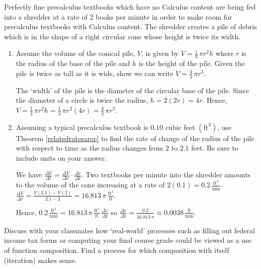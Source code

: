 \documentclass{ximera}
\begin{document}
\begin{problem}
Perfectly fine precalculus textbooks which have no Calculus content are being fed into a shredder at a rate of 2 books per minute in order to make room for precalculus textbooks with Calculus content.  The shredder creates a pile of debris which is in the shape of a right circular cone whose height is twice its width. 

\begin{enumerate}

\item  Assume the volume of the conical pile, $V$,  is given by $V = \frac{1}{3} \, \pi r^2 h$ where $r$ is the radius of the base of the pile and $h$ is the height of the pile.  Given the pile is twice as tall as it is wide, show we can write $V = \frac{4}{3} \, \pi r^3$.

\begin{solution}
    The `width' of the pile is the diameter of the circular base of the pile.  Since the diameter of a circle is twice the radius,  $h = 2 (2r) = 4r$.  Hence, $V = \frac{1}{3} \, \pi r^2 h = \frac{1}{3} \, \pi r^2 (4r) = \frac{4}{3} \, \pi r^3$.
\end{solution}

\item  Assuming a typical precalculus textbook is $0.10$ cubic feet $\left( \text{ft}^3 \right)$, use Theorem \ref{relatedratesaroc} to find the rate of change of the radius of the pile with respect to time as the radius changes from $2$ to $2.1$ feet. Be sure to include units on your answer.

\begin{solution}
     We have $\frac{\Delta V}{\Delta t} = \frac{\Delta V}{ \Delta r} \cdot \frac{\Delta r}{\Delta t}$.    Two textbooks per minute into the shredder amounts to the volume of the cone increasing at a rate of $2(0.1) = 0.2 \, \frac{\text{ft}^3}{\text{min}}$.  $\frac{\Delta V}{\Delta r}= \frac{V(2.1) - V(2)}{2.1 - 2} = 16.81\overline{3}  \, \pi \, \frac{\text{ft}^3}{\text{ft}}$.

Hence, $0.2 \, \frac{\text{ft}^3}{\text{min}} = 16.81\overline{3} \, \pi \, \frac{\text{ft}^3}{\text{ft}} \, \frac{\Delta r}{\Delta t}$ so $\frac{\Delta r}{\Delta t} = \frac{0.2}{ 16.81\overline{3} \, \pi }  \approx 0.0038 \, \frac{\text{ft}}{\text{min}}$.

\end{solution}

\end{enumerate}
\end{problem}

\begin{problem}
Discuss with your classmates how `real-world' processes such as filling out federal income tax forms or computing your final course grade could be viewed as a use of function composition.  Find a process for which composition with itself (iteration) makes sense.
\end{problem}
\end{document}
